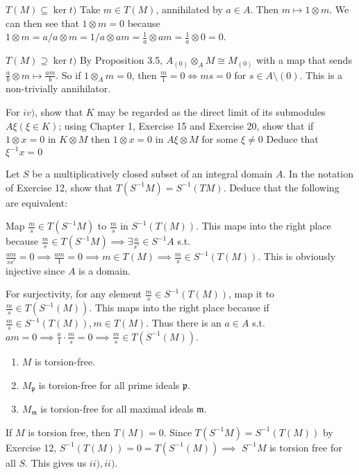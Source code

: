 \begin{questions}
\begin{enumerate}
\begin{solution}
		$T(M) \subseteq \ker t) $ Take $m \in T(M) $, annihilated by $a\in A$.
		Then $m\mapsto 1 \otimes m $.
		We can then see that $1 \otimes m = 0$ because $1 \otimes m = a / a \otimes m = 1 / a \otimes am = \frac{1}{a} \otimes am = \frac{1}{a} \otimes 0 = 0$.

		$T(M) \supseteq \ker t) $ By Proposition 3.5, $A_{(0)} \otimes_A M \cong M_{(0)} $ with a map that sends $\frac{a}{b} \otimes m \mapsto \frac{am}{b} $.
		So if $1 \otimes_A m = 0 $, then $\frac{m}{1} = 0 \iff ms = 0 $ for $s\in A\setminus (0) $.
		This is a non-trivially annihilator.
	\end{solution}
\end{enumerate}
\ifhint
	For $iv) $, show that $K $ may be regarded as the direct limit of its submodules $A\xi(\xi \in K) $; using Chapter 1, Exercise 15 and Exercise 20, show that if $1 \otimes x = 0 $ in $K \otimes M $ then $1 \otimes x = 0 $ in $A\xi \otimes M $ for some $\xi \ne 0 $ Deduce that $\xi ^{-1} x = 0 $
\fi

\question Let $S $ be a multiplicatively closed subset of an integral domain $A $. In the notation of Exercise 12, show that $T(S^{-1}M)= S^{-1}(TM) $. Deduce that the following are equivalent:
\begin{solution}
	Map $\frac{m}{s} \in T(S^{-1}M) $ to $\frac{m}{s} $ in $S^{-1}(T(M)) $.
	This maps into the right place because $\frac{m}{s} \in T(S^{-1}M) \implies \exists \frac{a}{s'}\in S^{-1}A$ s.t. $\frac{am}{ss'} = 0 \implies \frac{am}{1} = 0 \implies m \in T(M) \implies \frac{m}{s} \in S^{-1}(T(M))$.
	This is obviously injective since $A $ is a domain.

	For surjectivity, for any element $\frac{m}{s} \in S^{-1}(T(M)) $, map it to $\frac{m}{s} \in T(S^{-1}(M)) $.
	This maps into the right place because if $\frac{m}{s} \in S^{-1}(T(M)), m \in T(M) $.
	Thus there is an $a \in A $ s.t. $am = 0 \implies \frac{a}{1}\cdot \frac{m}{s} = 0 \implies \frac{m}{s} \in T(S^{-1}(M))$.
\end{solution}
\begin{enumerate}
	\item $M $ is torsion-free.
	\item $M_{\mathfrak{p}} $ is torsion-free for all prime ideals $\mathfrak{p} $.
	\item $M_{\mathfrak{m}} $ is torsion-free for all maximal ideals $\mathfrak{m} $.
\end{enumerate}
\begin{solution}
	If $M $ is torsion free, then $T(M) = 0 $.
	Since $T(S^{-1}M) = S^{-1}(T(M)) $ by Exercise 12, $S^{-1}(T(M)) = 0 = T(S^{-1}(M)) \implies $ $S^{-1}M $ is torsion free for all $S $.
	This gives us $ii),ii) $.


\end{solution}
\end{questions}
